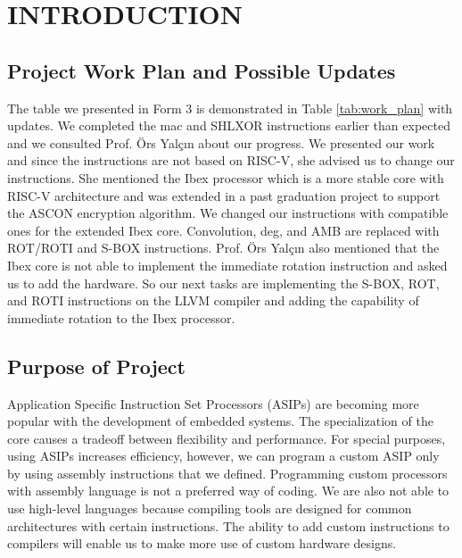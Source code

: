 \chapter{INTRODUCTION}\label{Ch1}


\section{Project Work Plan and Possible Updates}\label{plan}

The table we presented in Form 3 is demonstrated in Table \ref{tab:work_plan} with updates. We completed the mac and SHLXOR \cite{Sairoglu} instructions earlier than expected and we consulted Prof. Örs Yalçın about our progress. We presented our work and since the instructions are not based on RISC-V, she advised us to change our instructions. She mentioned the Ibex processor which is a more stable core with RISC-V architecture and was extended in a past graduation project to support the ASCON encryption algorithm. We changed our instructions with compatible ones for the extended Ibex core. Convolution, deg, and AMB are replaced with ROT/ROTI and S-BOX instructions. Prof. Örs Yalçın also mentioned that the Ibex core is not able to implement the immediate rotation instruction and asked us to add the hardware. So our next tasks are implementing the S-BOX, ROT, and ROTI instructions on the LLVM compiler and adding the capability of immediate rotation to the Ibex processor. 


\section{Purpose of Project}
Application Specific Instruction Set Processors (ASIPs) are becoming more popular with the development of embedded systems. The specialization of the core causes a tradeoff between flexibility and performance. For special purposes, using ASIPs increases efficiency, however, we can program a custom ASIP only by using assembly instructions that we defined. Programming custom processors with assembly language is not a preferred way of coding. We are also not able to use high-level languages because compiling tools are designed for common architectures with certain instructions. The ability to add custom instructions to compilers will enable us to make more use of custom hardware designs.

